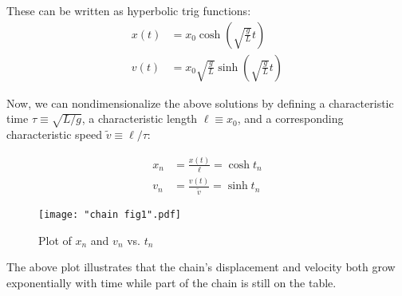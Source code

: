 \documentclass{article}
\begin{document}
These can be written as hyperbolic trig functions:
\begin{equation}
\begin{aligned}
x(t) &= x_0 \cosh \left(\sqrt{\frac{g}{L}} t\right) \\
v(t) &= x_0 \sqrt{\frac{g}{L}} \sinh \left(\sqrt{\frac{g}{L}} t\right)
\end{aligned}
\end{equation}

Now, we can nondimensionalize the above solutions by defining a characteristic time $\tau \equiv \sqrt{L/g}$, a characteristic length $\ell \equiv x_0$, and a corresponding characteristic speed  $\tilde{v} \equiv \ell/\tau$:

\begin{equation}
\begin{aligned}
x_n &= \frac{x(t)}{\ell} = \cosh t_n \\
v_n &= \frac{v(t)}{\tilde{v}} = \sinh t_n
\end{aligned}
\end{equation}

\begin{figure}[H]
	\centering
	\texttt{[image: "chain fig1".pdf]}
	\caption{Plot of $x_n$ and $v_n$ vs. $t_n$}\label{Fig:graph}
\end{figure}

The above plot illustrates that the chain's displacement and velocity both grow exponentially with time while part of the chain is still on the table.
\end{document}

